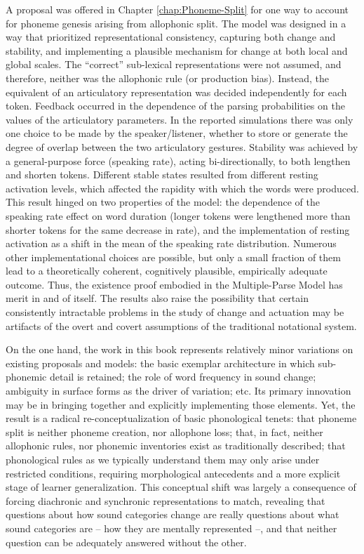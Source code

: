 A proposal was offered in Chapter \ref{chap:Phoneme-Split} for one
way to account for phoneme genesis arising from allophonic split.
The model was designed in a way that prioritized representational
consistency, capturing both change and stability, and implementing
a plausible mechanism for change at both local and global scales.
The “correct” sub-lexical representations were not assumed,
and therefore, neither was the allophonic rule (or production bias).
Instead, the equivalent of an articulatory representation was decided
independently for each token. Feedback occurred in the dependence
of the parsing probabilities on the values of the articulatory parameters.
In the reported simulations there was only one choice to be made by
the speaker/listener, whether to store or generate the degree of overlap
between the two articulatory gestures. Stability was achieved by a
general-purpose force (speaking rate), acting bi-directionally, to
both lengthen and shorten tokens. Different stable states resulted
from different resting activation levels, which affected the rapidity
with which the words were produced. This result hinged on two properties
of the model: the dependence of the speaking rate effect on word duration
(longer tokens were lengthened more than shorter tokens for the same
decrease in rate), and the implementation of resting activation as
a shift in the mean of the speaking rate distribution. Numerous other
implementational choices are possible, but only a small fraction of
them lead to a theoretically coherent, cognitively plausible, empirically
adequate outcome. Thus, the existence proof embodied in the Multiple-Parse
Model has merit in and of itself. The results also raise the possibility
that certain consistently intractable problems in the study of change
and actuation may be artifacts of the overt and covert assumptions
of the traditional notational system.

On the one hand, the work in this book represents relatively minor
variations on existing proposals and models: the basic exemplar architecture
in which sub-phonemic detail is retained; the role of word frequency
in sound change; ambiguity in surface forms as the driver of variation;
etc. Its primary innovation may be in bringing together and explicitly
implementing those elements. Yet, the result is a radical re-conceptualization
of basic phonological tenets: that phoneme split is neither phoneme
creation, nor allophone loss; that, in fact, neither allophonic rules,
nor phonemic inventories exist as traditionally described; that phonological
rules as we typically understand them may only arise under restricted
conditions, requiring morphological antecedents and a more explicit
stage of learner generalization. This conceptual shift was largely
a consequence of forcing diachronic and synchronic representations
to match, revealing that questions about how sound categories change
are really questions about what sound categories are – how they are
mentally represented –, and that neither question can be adequately
answered without the other.